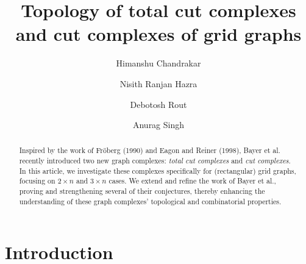 \documentclass[11pt,reqno,a4paper]{amsart}
\theoremstyle{definition}
\theoremstyle{theorem}
\theoremstyle{remark}
\begin{document}
\title{Topology of total cut complexes and cut complexes of grid graphs}

\author{Himanshu Chandrakar}
\author{Nisith Ranjan Hazra}
\author{Debotosh Rout}
\author{Anurag Singh}

\newcommand{\Addresses}{
  \bigskip
  \footnotesize

  \textsc{Department of Mathematics, Indian Institute of Technology Bhilai, India}\par\nopagebreak
  \textit{E-mail address}: HC: \texttt{himanshuc@iitbhilai.ac.in} \\
  \hspace*{2.45cm}NRH: \texttt{nisith.mds2024@cmi.ac.in} \\
  \hspace*{2.45cm}DR: \texttt{dr.24p10068@nitdgp.ac.in}\\
  \hspace*{2.45cm} AS: \texttt{anurags@iitbhilai.ac.in}
}


\begin{abstract}
    Inspired by the work of Fr{\"o}berg (1990) and Eagon and Reiner (1998), Bayer et al. recently introduced two new graph complexes: \emph{total cut complexes} and \emph{cut complexes}. In this article, we investigate these complexes specifically for (rectangular) grid graphs, focusing on $2 \times n$ and $3 \times n$ cases. We extend and refine the work of Bayer et al., proving and strengthening several of their conjectures, thereby enhancing the understanding of these graph complexes' topological and combinatorial properties.

\end{abstract}

\maketitle

\section{Introduction}
\end{document}
